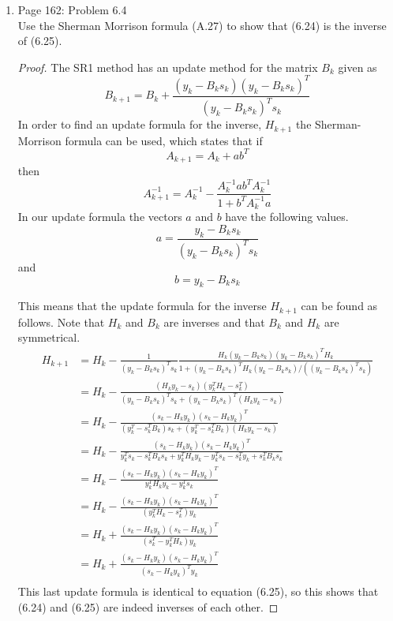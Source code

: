 \documentclass[11pt, oneside]{article}
\begin{document}
\begin{enumerate}
  \item %
    Page 162: Problem 6.4 \\
    Use the Sherman Morrison formula (A.27) to show that (6.24) is the inverse
    of (6.25).

    \begin{proof}
      The SR1 method has an update method for the matrix $B_k$ given as
      \[
        B_{k+1} = B_k + \frac{(y_k - B_ks_k)(y_k - B_ks_k)^T}{(y_k - B_ks_k)^T s_k}
      \]
      In order to find an update formula for the inverse, $H_{k+1}$ the Sherman-Morrison
      formula can be used, which states that if
      \[
        A_{k+1} = A_k + ab^T
      \]
      then
      \[
        A_{k+1}^{-1} = A_k^{-1} - \frac{A_k^{-1} ab^T A_k^{-1}}{1 + b^T A_k^{-1}a}
      \]
      In our update formula the vectors $a$ and $b$ have the following values.
      \[
        a = \frac{y_k - B_k s_k}{(y_k - B_ks_k)^T s_k}
      \]
      and
      \[
        b = y_k - B_k s_k
      \]

      This means that the update formula for the inverse $H_{k+1}$ can be found
      as follows.
      Note that $H_k$ and $B_k$ are inverses and that $B_k$ and $H_k$ are symmetrical.
      \begin{align*}
        H_{k+1} &= H_k - \frac{1}{(y_k - B_ks_k)^T s_k} \frac{H_k (y_k - B_k s_k)(y_k - B_k s_k)^T H_k}{1 + (y_k - B_k s_k)^T H_k (y_k - B_k s_k)/((y_k - B_ks_k)^T s_k)} \\
        &= H_k - \frac{(H_k y_k - s_k)(y_k^T H_k - s_k^T)}{(y_k - B_ks_k)^T s_k + (y_k - B_k s_k)^T (H_k y_k - s_k)} \\
        &= H_k - \frac{(s_k - H_k y_k)(s_k - H_k y_k)^T}{(y_k^T - s_k^T B_k) s_k + (y_k^T - s_k^T B_k) (H_k y_k - s_k)} \\
        &= H_k - \frac{(s_k - H_k y_k)(s_k - H_k y_k)^T}{y_k^T s_k - s_k^T B_k s_k + y_k^T H_k y_k - y_k^T s_k - s_k^T y_k + s_k^TB_k s_k} \\
        &= H_k - \frac{(s_k - H_k y_k)(s_k - H_k y_k)^T}{y_k^T H_k y_k - y_k^T s_k} \\
        &= H_k - \frac{(s_k - H_k y_k)(s_k - H_k y_k)^T}{(y_k^T H_k - s_k^T) y_k} \\
        &= H_k + \frac{(s_k - H_k y_k)(s_k - H_k y_k)^T}{(s_k^T - y_k^T H_k) y_k} \\
        &= H_k + \frac{(s_k - H_k y_k)(s_k - H_k y_k)^T}{(s_k - H_k y_k)^T y_k} \\
      \end{align*}
      This last update formula is identical to equation (6.25), so this shows
      that (6.24) and (6.25) are indeed inverses of each other.
    \end{proof}


\end{enumerate}
\end{document}
